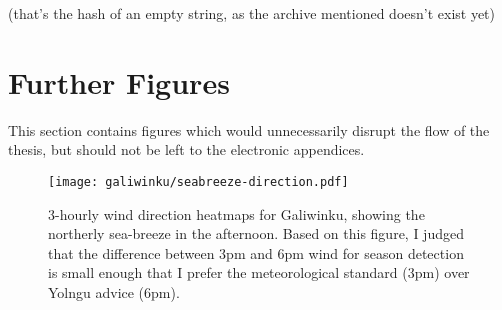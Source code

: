 (that's the hash of an empty string, as the archive mentioned doesn't exist yet)



\section{Further Figures}
This section contains figures which would unnecessarily disrupt the
flow of the thesis, but should not be left to the electronic appendices.

\begin{figure}[p]
    \centering
    \texttt{[image: galiwinku/seabreeze-direction.pdf]}
    \caption[3-hourly wind direction heatmaps, Galiwinku]{
        3-hourly wind direction heatmaps for Galiwinku,
        showing the northerly sea-breeze in the afternoon.
        Based on this figure, I judged that the difference between
        3pm and 6pm wind for season detection is small enough that
        I prefer the meteorological standard (3pm) over Yolngu advice (6pm).}
    \label{fig:galiwinku-seabreeze-direction}
\end{figure}
